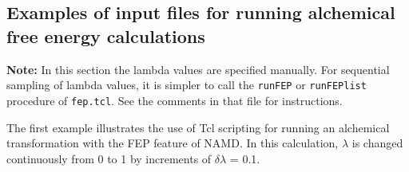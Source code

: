 \begin{itemize}

\end{itemize}



\subsection{Examples of input files for running alchemical free energy calculations}

\textbf{Note:} In this section the lambda values are specified manually.
For sequential sampling of lambda values, it is simpler to call the 
\texttt{runFEP} or \texttt{runFEPlist} procedure of \texttt{fep.tcl}.
See the comments in that file for instructions.

The first example illustrates the use of {\sc Tcl} scripting for running
an alchemical transformation with the FEP feature of NAMD. In this
calculation, $\lambda$ is changed continuously from 0 to 1
by increments of $\delta \lambda$ = 0.1.


